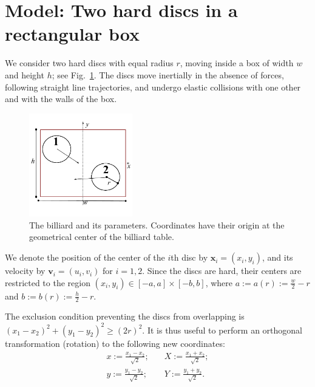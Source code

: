 \documentclass[superscriptaddress,pre,reprint,showpacs,twocolumn]{revtex4-1}
\newcommand{\defeq}{:=}
\begin{document}
\section{Model: Two hard discs in a rectangular box}

We consider two hard discs with equal radius $r$,
moving inside a box of width $w$ and height $h$; see Fig.~\ref{billar01}. 
The discs move inertially in the absence of forces, 
following straight line trajectories,
and undergo elastic collisions with one 
other and with the walls of the box.

\begin{figure}[h]
  \begin{center}
    \includegraphics[width=0.40\textwidth]{figures/DiscsBox01.pdf}
  \end{center}
  \caption{The billiard and its parameters. Coordinates
    have their origin at the geometrical center of the 
    billiard table.}\label{billar01}
\end{figure}


We denote the position of the center of the $i$th disc by 
$\mathbf{x}_i = (x_i, y_i)$, and its velocity by $\mathbf{v}_i = (u_i, v_i)$ for $i=1,2$. Since the discs are hard, 
their centers are restricted to the region 
$(x_i, y_i) \in [-a,a] \times [-b, b]$, where 
$a \defeq a(r) \defeq \frac{w}{2} - r $ and
$b \defeq b(r) \defeq \frac{h}{2} - r $.

The exclusion condition preventing the discs from overlapping is $(x_1-x_2)^2 + (y_1-y_2)^2 \ge (2r)^2$.
It is thus useful to perform an orthogonal transformation (rotation) to the following new coordinates:
\begin{equation}\label{cambiocoor01}
  \begin{split}
 x  \defeq \frac{x_1 - x_2}{\sqrt{2}};  &
\quad X  \defeq \frac{x_1 + x_2}{\sqrt{2}};  \\
 y  \defeq \frac{y_1 - y_2}{\sqrt{2}}; & 
\quad Y  \defeq \frac{y_1 + y_2}{\sqrt{2}}.
\end{split}
\end{equation}
\end{document}
